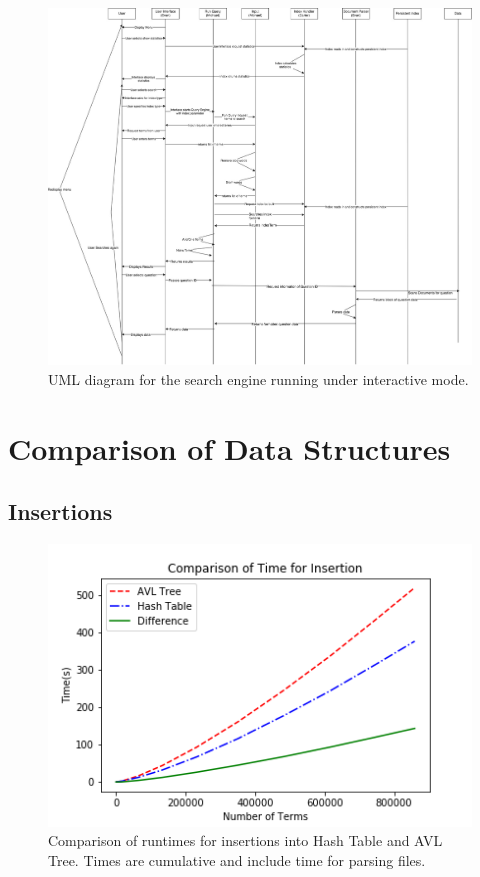 \documentclass{article}
\begin{document}
\begin{figure}[H]
  \centering
  \includegraphics[width=\linewidth]{DS_Query.jpg}
  \caption{UML diagram for the search engine running under interactive mode.}
\end{figure}

\section{Comparison of Data Structures}

\subsection{Insertions}

\begin{figure}[H]
  \centering
  \includegraphics[width=\linewidth]{comparison-insert.png}
  \caption{Comparison of runtimes for insertions into Hash Table and AVL Tree. Times are cumulative and include time for parsing files.}
\end{figure}
\end{document}
